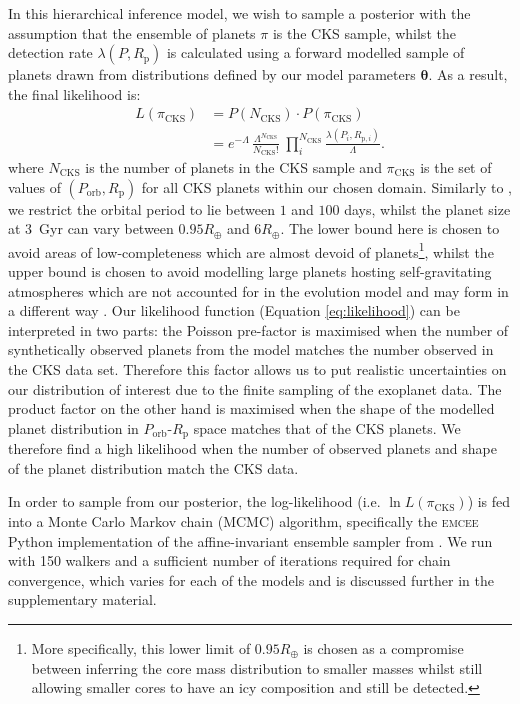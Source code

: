 \documentclass[fleqn,usenatbib]{mnras}
\begin{document}
In this hierarchical inference model, we wish to sample a posterior with the assumption that the ensemble of planets $\pi$ is the CKS sample, whilst the detection rate $\lambda(P,R_\text{p})$ is calculated using a forward modelled sample of planets drawn from distributions defined by our model parameters $\boldsymbol{\theta}$. As a result, the final likelihood is:
\begin{equation} \label{eq:likelihood}
\begin{split}
L(\pi_\text{CKS}) & = P(N_\text{CKS}) \cdot P(\pi_\text{CKS}) \\
 & = e^{-\Lambda} \, \frac{\Lambda^{N_\text{CKS}}}{N_\text{CKS}!} \; \prod_i^{N_\text{CKS}} \frac{\lambda(P_i, R_{\text{p},i})}{\Lambda}.
\end{split}
\end{equation}
where $N_{\text{CKS}}$ is the number of planets in the CKS sample and $\pi_\text{CKS}$ is the set of values of $(P_\text{orb}, R_\text{p})$ for all CKS planets within our chosen domain. Similarly to \cite{Fulton2017}, we restrict the orbital period to lie between $1$ and $100$ days, whilst the planet size at 3~Gyr can vary between $0.95R_\oplus$ and $6R_\oplus$. The lower bound here is chosen to avoid areas of low-completeness which are almost devoid of planets\footnote{More specifically, this lower limit of $0.95R_\oplus$ is chosen as a compromise between inferring the core mass distribution to smaller masses whilst still allowing smaller cores to have an icy composition and still be detected.}, whilst the upper bound is chosen to avoid modelling large planets hosting self-gravitating atmospheres which are not accounted for in the evolution model and may form in a different way \citep[e.g.][]{OwenLai2018}. Our likelihood function (Equation \ref{eq:likelihood}) can be interpreted in two parts: the Poisson pre-factor is maximised when the number of synthetically observed planets from the model matches the number observed in the CKS data set. Therefore this factor allows us to put realistic uncertainties on our distribution of interest due to the finite sampling of the exoplanet data. The product factor on the other hand is maximised when the shape of the modelled planet distribution in $P_\text{orb}$-$R_\text{p}$ space matches that of the CKS planets. We therefore find a high likelihood when the number of observed planets and shape of the planet distribution match the CKS data.

In order to sample from our posterior, the log-likelihood (i.e. $\ln L(\pi_\text{CKS})$) is fed into a Monte Carlo Markov chain (MCMC) algorithm, specifically the \textsc{emcee} Python implementation \citep{emcee} of the affine-invariant ensemble sampler from \cite{GoodmanWeare2010}. We run with 150 walkers and a sufficient number of iterations required for chain convergence, which varies for each of the models and is discussed further in the supplementary material.
\end{document}
